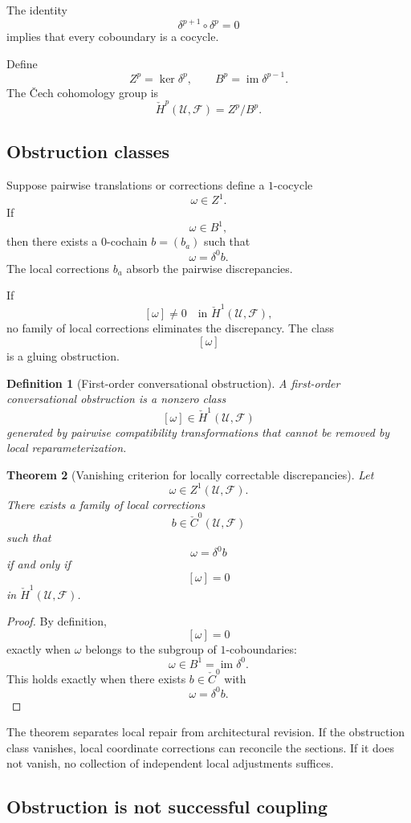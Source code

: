\documentclass[11pt]{article}
\newtheorem{definition}{Definition}[section]
\newtheorem{theorem}[definition]{Theorem}
\theoremstyle{definition}
\DeclareMathOperator{\im}{im}
\begin{document}
The identity
\[
\delta^{p+1}\circ\delta^p=0
\]
implies that every coboundary is a cocycle.

Define
\[
Z^p
=
\ker\delta^p,
\qquad
B^p
=
\im\delta^{p-1}.
\]
The Čech cohomology group is
\[
\check H^p(\mathcal U,\mathscr F)
=
Z^p/B^p.
\]

\subsection{Obstruction classes}

Suppose pairwise translations or corrections define a \(1\)-cocycle
\[
\omega\in Z^1.
\]
If
\[
\omega\in B^1,
\]
then there exists a \(0\)-cochain \(b=(b_a)\) such that
\[
\omega=\delta^0b.
\]
The local corrections \(b_a\) absorb the pairwise discrepancies.

If
\[
[\omega]\neq0
\quad
\text{in }
\check H^1(\mathcal U,\mathscr F),
\]
no family of local corrections eliminates the discrepancy. The class
\[
[\omega]
\]
is a gluing obstruction.

\begin{definition}[First-order conversational obstruction]
A first-order conversational obstruction is a nonzero class
\[
[\omega]
\in
\check H^1(\mathcal U,\mathscr F)
\]
generated by pairwise compatibility transformations that cannot be removed by local reparameterization.
\end{definition}

\begin{theorem}[Vanishing criterion for locally correctable discrepancies]
Let
\[
\omega\in Z^1(\mathcal U,\mathscr F).
\]
There exists a family of local corrections
\[
b\in\check C^0(\mathcal U,\mathscr F)
\]
such that
\[
\omega=\delta^0b
\]
if and only if
\[
[\omega]=0
\]
in \(\check H^1(\mathcal U,\mathscr F)\).
\end{theorem}

\begin{proof}
By definition,
\[
[\omega]=0
\]
exactly when \(\omega\) belongs to the subgroup of \(1\)-coboundaries:
\[
\omega\in B^1=\im\delta^0.
\]
This holds exactly when there exists \(b\in\check C^0\) with
\[
\omega=\delta^0b.
\]
\end{proof}

The theorem separates local repair from architectural revision. If the obstruction class vanishes, local coordinate corrections can reconcile the sections. If it does not vanish, no collection of independent local adjustments suffices.

\subsection{Obstruction is not successful coupling}
\end{document}
